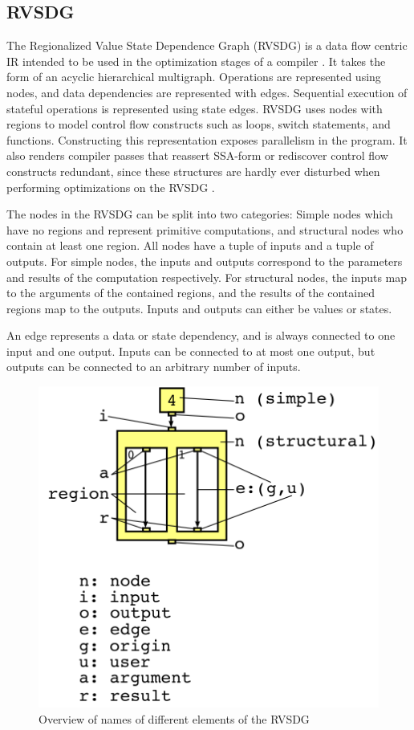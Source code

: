 \subsection{RVSDG}
The Regionalized Value State Dependence Graph (RVSDG) is a data flow centric IR intended to be used in the optimization stages of a compiler \cite{Reissmann2020}. It takes the form of an acyclic hierarchical multigraph. Operations are represented using nodes, and data dependencies are represented with edges. Sequential execution of stateful operations is represented using state edges. RVSDG uses nodes with regions to model control flow constructs such as loops, switch statements, and functions. Constructing this representation exposes parallelism in the program. It also renders compiler passes that reassert SSA-form or rediscover control flow constructs redundant, since these structures are hardly ever disturbed when performing optimizations on the RVSDG \cite{Reissmann2020}.

The nodes in the RVSDG can be split into two categories: Simple nodes which have no regions and represent primitive computations, and structural nodes who contain at least one region. All nodes have a tuple of inputs and a tuple of outputs. For simple nodes, the inputs and outputs correspond to the parameters and results of the computation respectively. For structural nodes, the inputs map to the arguments of the contained regions, and the results of the contained regions map to the outputs. Inputs and outputs can either be values or states.

An edge represents a data or state dependency, and is always connected to one input and one output. Inputs can be connected to at most one output, but outputs can be connected to an arbitrary number of inputs.
\begin{figure}[H]
    \centering
    \includegraphics[width=\textwidth/3]{Images/RVSDG_notation.png}
    \caption{Overview of names of different elements of the RVSDG \cite{Reissmann2020}}
    \label{fig:RVSDG_notation}
\end{figure}

